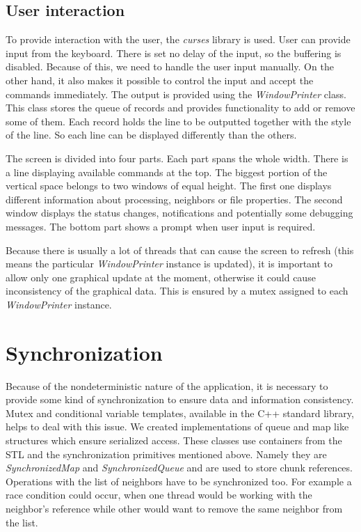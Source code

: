 \subsection*{User interaction}

To provide interaction with the user, the \textit{curses} library is
used. User can provide input from the keyboard. There is set no delay of
the input, so the buffering is disabled. Because of this, we need to
handle the user input manually. On the other hand, it also makes it
possible to control the input and accept the commands immediately. The
output is provided using the \textit{WindowPrinter} class. This class
stores the queue of records and provides functionality to add or remove
some of them. Each record holds the line to be outputted together with
the style of the line. So each line can be displayed differently than
the others.

The screen is divided into four parts. Each part spans the whole width.
There is a line displaying available commands at the top. The biggest
portion of the vertical space belongs to two windows of equal height.
The first one displays different information about processing, neighbors
or file properties. The second window displays the status changes,
notifications and potentially some debugging messages. The bottom part
shows a prompt when user input is required.

Because there is usually a lot of threads that can cause the screen to
refresh (this means the particular \textit{WindowPrinter} instance is
updated), it is important to allow only one graphical update at the
moment, otherwise it could cause inconsistency of the graphical data.
This is ensured by a mutex assigned to each \textit{WindowPrinter}
instance.

\section{Synchronization}\label{synchronization}

Because of the nondeterministic nature of the application, it is
necessary to provide some kind of synchronization to ensure data and
information consistency. Mutex and conditional variable templates,
available in the C++ standard library, helps to deal with this issue. We
created implementations of queue and map like structures which ensure
serialized access. These classes use containers from the STL and the
synchronization primitives mentioned above. Namely they are
\textit{SynchronizedMap} and \textit{SynchronizedQueue} and are used to
store chunk references. Operations with the list of neighbors have to be
synchronized too. For example a race condition could occur, when one
thread would be working with the neighbor's reference while other would
want to remove the same neighbor from the list.

